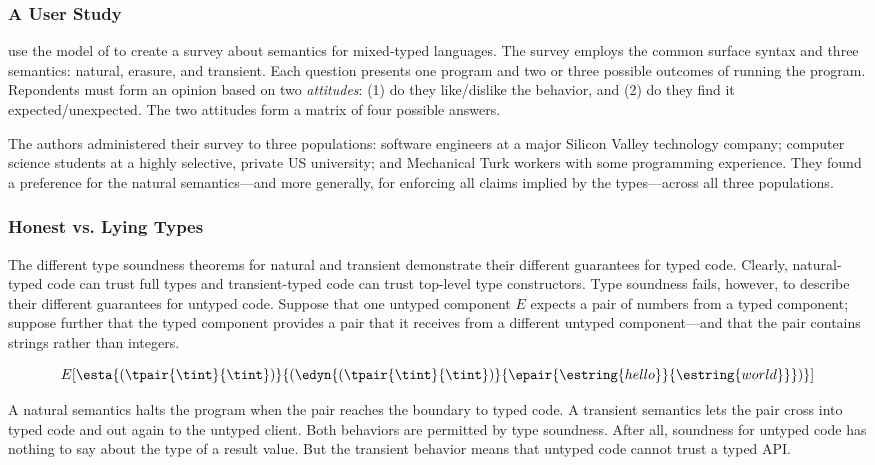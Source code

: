 \subsubsection{A User Study}

\citet{tgpk-dls-2018} use the model of \citet{gf-icfp-2018} to create a survey about semantics
 for mixed-typed languages.
The survey employs the common surface syntax and three semantics:
 natural, erasure, and transient.
Each question presents one program and two or three possible outcomes of running
 the program.
Repondents must form an opinion based on two \emph{attitudes}:
 (1) do they like/dislike the behavior,
 and (2) do they find it expected/unexpected.
The two attitudes form a matrix of four possible answers.

The authors administered their survey to three populations:
 software engineers at a major Silicon Valley technology company;
 computer science students at a highly selective, private US university;
 and Mechanical Turk workers with some programming experience.
They found a preference for the natural semantics---and more generally,
 for enforcing all claims implied by the types---across all three populations.


\subsubsection{Honest vs. Lying Types}

The different type soundness theorems for natural and transient
 demonstrate their different guarantees for typed code.
Clearly, natural-typed code can trust full types and transient-typed code
 can trust top-level type constructors.
Type soundness fails, however, to describe their different guarantees for
 untyped code.
Suppose that one untyped component $E$ expects a pair of numbers from a
 typed component;
 suppose further that the typed component provides a pair that it receives
 from a different untyped component---and that the pair contains strings
 rather than integers.

\[
  E[\esta{(\tpair{\tint}{\tint})}{(\edyn{(\tpair{\tint}{\tint})}{\epair{\estring{hello}}{\estring{world}}})}]
\]

\noindent
A natural semantics halts the program when the pair reaches the boundary to
 typed code.
A transient semantics lets the pair cross into typed code and out again to the
 untyped client.
Both behaviors are permitted by type soundness.
After all, soundness for untyped code has nothing to say about the type of a
 result value.
But the transient behavior means that untyped code cannot trust a typed
 API.

